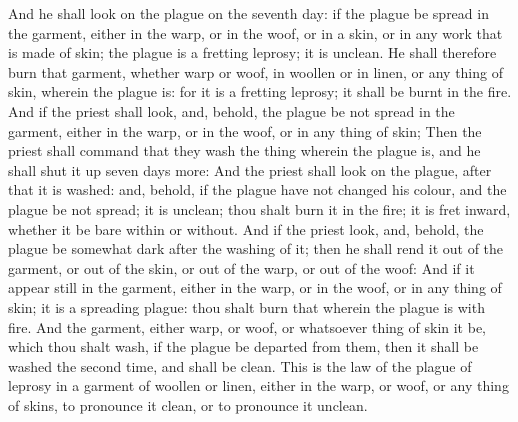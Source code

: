 \begin{biblechapter}
\verse And he shall look on the plague on the seventh day: if the plague be spread in the garment, either in the warp, or in the woof, or in a skin, or in any work that is made of skin; the plague is a fretting leprosy; it is unclean.
\verse He shall therefore burn that garment, whether warp or woof, in woollen or in linen, or any thing of skin, wherein the plague is: for it is a fretting leprosy; it shall be burnt in the fire.
\verse And if the priest shall look, and, behold, the plague be not spread in the garment, either in the warp, or in the woof, or in any thing of skin;
\verse Then the priest shall command that they wash the thing wherein the plague is, and he shall shut it up seven days more:
\verse And the priest shall look on the plague, after that it is washed: and, behold, if the plague have not changed his colour, and the plague be not spread; it is unclean; thou shalt burn it in the fire; it is fret inward, whether it be bare within or without.
\verse And if the priest look, and, behold, the plague be somewhat dark after the washing of it; then he shall rend it out of the garment, or out of the skin, or out of the warp, or out of the woof:
\verse And if it appear still in the garment, either in the warp, or in the woof, or in any thing of skin; it is a spreading plague: thou shalt burn that wherein the plague is with fire.
\verse And the garment, either warp, or woof, or whatsoever thing of skin it be, which thou shalt wash, if the plague be departed from them, then it shall be washed the second time, and shall be clean.
\verse This is the law of the plague of leprosy in a garment of woollen or linen, either in the warp, or woof, or any thing of skins, to pronounce it clean, or to pronounce it unclean.
\end{biblechapter}

